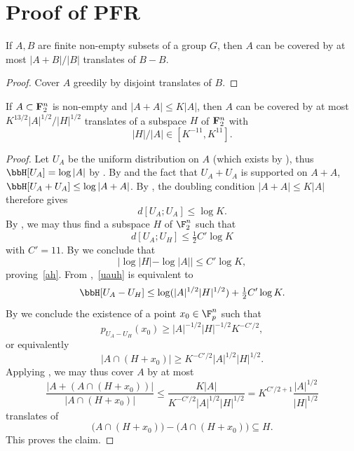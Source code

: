 \chapter{Proof of PFR}

\begin{lemma}
\label{ruz-cov}
\leanok
If $A,B$ are finite non-empty subsets of a group $G$, then $A$ can be covered by at most $|A+B|/|B|$ translates of $B-B$.
\end{lemma}
\begin{proof}
\leanok
Cover $A$ greedily by disjoint translates of $B$.
\end{proof}

\begin{lemma}\label{pfr_aux}
  \leanok If $A \subset {\bf F}_2^n$ is non-empty and
  $|A+A| \leq K|A|$, then $A$ can be covered by at most $K ^
  {13/2}|A|^{1/2}/|H|^{1/2}$ translates of a subspace $H$ of ${\bf F}_2^n$ with
  \begin{equation}
    \label{ah}
    |H|/|A| \in [K^{-11}, K^{11}].
  \end{equation}
  \end{lemma}

\begin{proof}\leanok
  Let $U_A$ be the uniform distribution on $A$ (which exists by ), thus $\bbH[U_A] = \log |A|$ by . By  and the fact that $U_A + U_A$ is supported on $A + A$, $\bbH[U_A + U_A] \leq \log|A+A|$. By , the doubling condition $|A+A| \leq K|A|$ therefore gives
  \[d[U_A;U_A] \leq \log K.\]
  By , we may thus find a subspace $H$ of $\F_2^n$ such that
  \begin{equation}\label{uauh} d[U_A;U_H] \leq \tfrac{1}{2} C' \log K\end{equation}
  with $C' = 11$.
  By  we conclude that
  \begin{equation*}
    |\log |H| - \log |A|| \leq C' \log K,
  \end{equation*}
  proving~\eqref{ah}.
  From ,~\eqref{uauh} is equivalent to
  \[\bbH[U_A - U_H] \leq \log( |A|^{1/2} |H|^{1/2}) + \tfrac{1}{2} C' \log K.\]
  By  we conclude the existence of a point $x_0 \in \F_p^n$ such that
  \[p_{U_A-U_H}(x_0) \geq |A|^{-1/2} |H|^{-1/2} K^{-C'/2},\]
  or equivalently
  \[|A \cap (H + x_0)| \geq K^{-C'/2} |A|^{1/2} |H|^{1/2}.\]
  Applying , we may thus cover $A$ by at most
  \[\frac{|A + (A \cap (H+x_0))|}{|A \cap (H + x_0)|} \leq \frac{K|A|}{K^{-C'/2} |A|^{1/2} |H|^{1/2}} = K^{C'/2+1} \frac{|A|^{1/2}}{|H|^{1/2}}\]
  translates of
  \[\bigl(A \cap (H + x_0)\bigr) - \bigl(A \cap (H + x_0)\bigr) \subseteq H.\]
  This proves the claim.
\end{proof}


